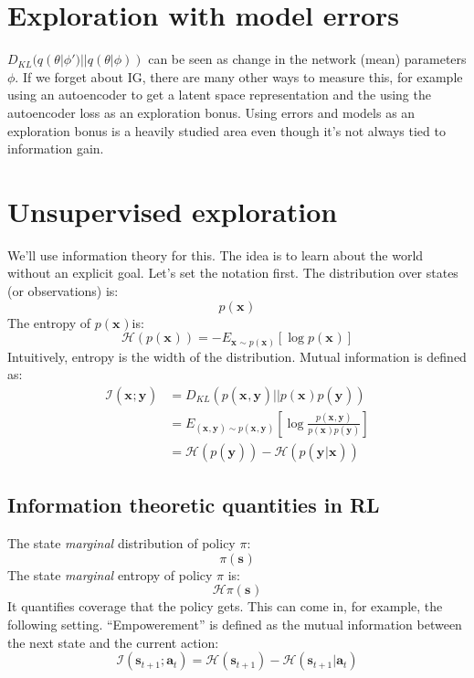\documentclass{report}
\begin{document}
\section{Exploration with model errors}
$ D_{KL}(q(\theta|\phi')||q(\theta|\phi))  $ can be seen as change in the network (mean) parameters $ \phi  $.
If we forget about IG, there are many other ways to measure this,
for example using an autoencoder to get a latent space representation and the using the autoencoder
loss as an exploration bonus.
Using errors and models as an exploration bonus is a heavily studied area even though it's
not always tied to information gain.

\section{Unsupervised exploration}
We'll use information theory for this.
The idea is to learn about the world without an explicit goal.
Let's set the notation first.
The distribution over states (or observations) is:
\begin{equation}
		p(\bm{x}_{})
\end{equation}
The entropy of $ p(\bm{x}_{})  $is:
\begin{equation}
		\mathcal{H}(p(\bm{x}_{})) = - E_{\bm{x}_{} \sim p(\bm{x}_{})} \left[ \log p(\bm{x}_{}) \right] 
\end{equation}
Intuitively, entropy is the width of the distribution.
Mutual information is defined as:
\begin{align}
		\mathcal{I}(\bm{x}_{};\bm{y}_{}) &= D_{KL}(p(\bm{x}_{}, \bm{y}_{})||p(\bm{x}_{})p(\bm{y}_{})) \\
										 &=
		E_{(\bm{x}_{}, \bm{y}_{}) \sim p(\bm{x}_{}, \bm{y}_{})}  \left[ \log \frac{p(\bm{x}_{},\bm{y}_{})}{p(\bm{x}_{})p(\bm{y}_{})}  \right] \\
 &= \mathcal{H}(p(\bm{y}_{})) - \mathcal{H}(p(\bm{y}_{}|\bm{x}_{}))
\end{align}

\subsection{Information theoretic quantities in RL}
The state \textit{marginal} distribution of policy $ \pi  $:
\begin{equation}
		\pi(\bm{s}_{})
\end{equation}
The state \textit{marginal} entropy of policy $ \pi  $ is:
\begin{equation}
		\mathcal{H}\pi(\bm{s}_{})
\end{equation}
It quantifies coverage that the policy gets.
This can come in, for example, the following setting.
``Empowerement'' is defined as the mutual information between the next state and the current action:
\begin{equation}
		\mathcal{I}(\bm{s}_{t+1}; \bm{a}_{t}) = 
		\mathcal{H}(\bm{s}_{t+1}) - \mathcal{H}(\bm{s}_{t+1}|\bm{a}_{t})
\end{equation}
\end{document}
